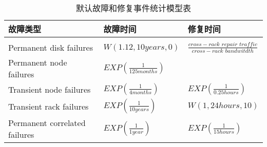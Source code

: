 \begin{table}[htbp]
	\centering
	\caption{默认故障和修复事件统计模型表}
	\begin{tabular}{lll}
		\toprule
        故障类型  & 故障时间 & 修复时间 \\[1pt]
        \hline
        \\[-15pt]  
        Permanent disk failures & $W(1.12, 10 years, 0)$ & $\frac{cross-rack\,\,repair\,\,traffic}{cross-rack\,\,bandwitdth}$ \\
        Permanent node failures & $EXP\left( \frac{1}{125 months} \right) $ &  \\
        Transient node failures & $EXP\left( \frac{1}{4 months} \right) $ & $EXP\left( \frac{1}{0.25 hours} \right) $ \\
        Transient rack failures & $EXP\left( \frac{1}{10 years} \right) $ & $W(1, 24 hours, 10)$ \\
        Permanent correlated failures & $EXP\left( \frac{1}{1 year} \right) $ & $EXP\left( \frac{1}{15 hours} \right) $ \\
		\midrule
	\end{tabular}
	\label{table:5-2}
\end{table}


